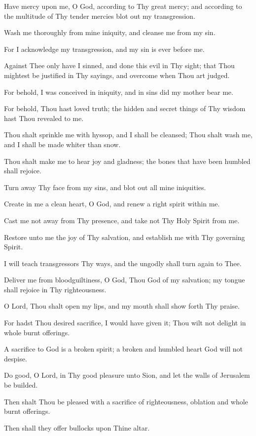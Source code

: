Have mercy upon me, O God, according to Thy great mercy; and according to the multitude of Thy tender mercies blot out my transgression.

Wash me thoroughly from mine iniquity, and cleanse me from my sin.

For I acknowledge my transgression, and my sin is ever before me.

Against Thee only have I sinned, and done this evil in Thy sight; that Thou mightest be justified in Thy sayings, and overcome when Thou art judged.

For behold, I was conceived in iniquity, and in sins did my mother bear me.

For behold, Thou hast loved truth; the hidden and secret things of Thy wisdom hast Thou revealed to me.

Thou shalt sprinkle me with hyssop, and I shall be cleansed; Thou shalt wash me, and I shall be made whiter than snow.

Thou shalt make me to hear joy and gladness; the bones that have been humbled shall rejoice.

Turn away Thy face from my sins, and blot out all mine iniquities.

Create in me a clean heart, O God, and renew a right spirit within me.

Cast me not away from Thy presence, and take not Thy Holy Spirit from me.

Restore unto me the joy of Thy salvation, and establish me with Thy governing Spirit.

I will teach transgressors Thy ways, and the ungodly shall turn again to Thee.

Deliver me from bloodguiltiness, O God, Thou God of my salvation; my tongue shall rejoice in Thy righteousness.

O Lord, Thou shalt open my lips, and my mouth shall show forth Thy praise.

For hadst Thou desired sacrifice, I would have given it; Thou wilt not delight in whole burnt offerings.

A sacrifice to God is a broken spirit; a broken and humbled heart God will not despise.

Do good, O Lord, in Thy good pleasure unto Sion, and let the walls of Jerusalem be builded.

Then shalt Thou be pleased with a sacrifice of righteousness, oblation and whole burnt offerings.

Then shall they offer bullocks upon Thine altar.
